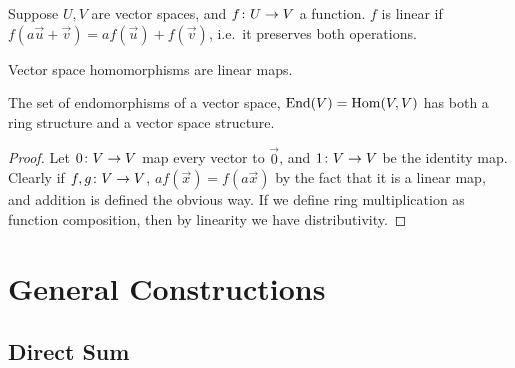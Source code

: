 \begin{definition}
    Suppose \(U,V\) are vector spaces, and \(f\colon U\to V\) a function.
    \(f\) is linear if \(f(a\vec{u}+\vec{v}) = af(\vec{u}) + f(\vec{v})\),
    i.e.\ it preserves both operations.
\end{definition}
\begin{definition}
    Vector space homomorphisms are linear maps.
\end{definition}
\begin{proposition}
    The set of endomorphisms of a vector space, \(\operatorname{End}(V) = \operatorname{Hom}(V,V)\)
    has both a ring structure and a vector space structure.
\end{proposition}
\begin{proof}
    Let \(0\colon V\to V\) map every vector to \(\vec{0}\),
    and \(1\colon V\to V\) be the identity map.
    Clearly if \(f,g\colon V\to V\),
    \(af(\vec{x}) = f(a\vec{x})\) by the fact that it is a linear map,
    and addition is defined the obvious way.
    If we define ring multiplication as function composition,
    then by linearity we have distributivity.
\end{proof}

\section{General Constructions}

\subsection*{Direct Sum}

